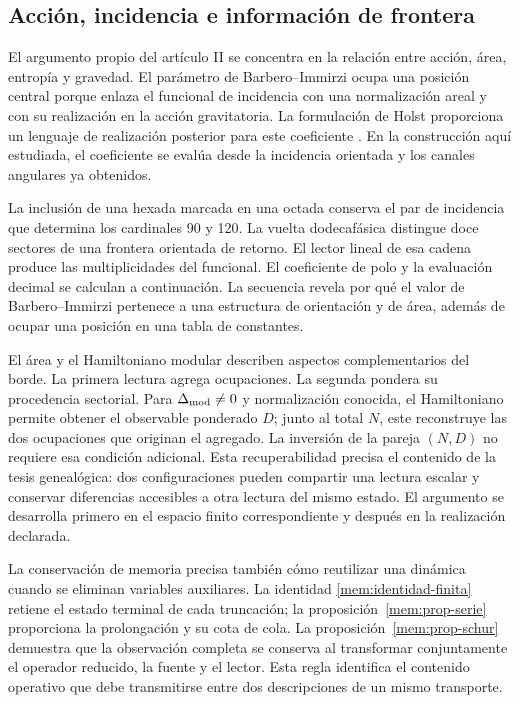 \subsection{Acción, incidencia e información de frontera}

El argumento propio del artículo II se concentra en la relación entre
acción, área, entropía y gravedad. El parámetro de Barbero--Immirzi ocupa
una posición central porque enlaza el funcional de incidencia con una
normalización areal y con su realización en la acción gravitatoria.
La formulación de Holst proporciona un lenguaje de realización posterior
para este coeficiente \cite{holst1996}. En la construcción aquí estudiada,
el coeficiente se evalúa desde la incidencia orientada y los canales
angulares ya obtenidos.

La inclusión de una hexada marcada en una octada conserva el par de
incidencia que determina los cardinales 90 y 120. La vuelta dodecafásica
distingue doce sectores de una frontera orientada de retorno. El lector
lineal de esa cadena produce las multiplicidades del funcional. El
coeficiente de polo y la evaluación decimal se calculan a continuación.
La secuencia revela por qué el valor de Barbero--Immirzi pertenece a una
estructura de orientación y de área, además de ocupar una posición en
una tabla de constantes.

El área y el Hamiltoniano modular describen aspectos complementarios
del borde. La primera lectura agrega ocupaciones. La segunda pondera
su procedencia sectorial. Para \(\Delta_{\rm mod}\ne0\) y
normalización conocida, el Hamiltoniano permite obtener el observable
ponderado \(D\); junto al total \(N\), este reconstruye las dos
ocupaciones que originan el agregado. La inversión de la pareja
\((N,D)\) no requiere esa condición adicional. Esta recuperabilidad precisa
el contenido de la tesis genealógica: dos configuraciones pueden
compartir una lectura escalar y conservar diferencias accesibles a otra
lectura del mismo estado. El argumento se desarrolla primero en el
espacio finito correspondiente y después en la realización declarada.

La conservación de memoria precisa también cómo reutilizar una dinámica
cuando se eliminan variables auxiliares. La identidad
\eqref{mem:identidad-finita} retiene el estado terminal de cada truncación;
la proposición~\ref{mem:prop-serie} proporciona la prolongación y su cota
de cola. La proposición~\ref{mem:prop-schur} demuestra que la observación
completa se conserva al transformar conjuntamente el operador reducido,
la fuente y el lector. Esta regla identifica el contenido operativo que
debe transmitirse entre dos descripciones de un mismo transporte.

